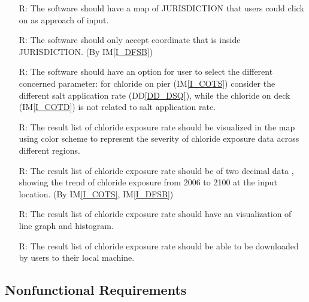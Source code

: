 \documentclass[12pt]{article}
\newcommand{\ddref}[1]{DD\ref{#1}}
\newcommand{\iref}[1]{IM\ref{#1}}
\newcounter{reqnum} %
\begin{document}
\begin{itemize}
\item[R\refstepcounter{reqnum}\thereqnum \label{R_InputMap}:] The software should have a map of JURISDICTION that users could click on as approach of input.

\item[R\refstepcounter{reqnum}\thereqnum \label{R_Inputs}:] The software should only accept coordinate that is inside JURISDICTION. (By \iref{I_DFSB})

\item[R\refstepcounter{reqnum}\thereqnum \label{R_Parameter}:] The software should have an option for user to select the different concerned parameter: for chloride on pier (\iref{I_COTS}) consider the different salt application rate (\ddref{DD_DSQ}), while the chloride on deck (\iref{I_COTD}) is not related to salt application rate.

\item[R\refstepcounter{reqnum}\thereqnum \label{R_Map}:] The result list of chloride exposure rate should be visualized in the map using color scheme to represent the severity of chloride exposure data across different regions.

\item[R\refstepcounter{reqnum}\thereqnum \label{R_OutputInputs}:] The result list of chloride exposure rate should be of two decimal data , showing the trend of chloride exposure from 2006 to 2100 at the input location. (By \iref{I_COTS}, \iref{I_DFSB})

\item[R\refstepcounter{reqnum}\thereqnum \label{R_OutputVisualization}:] The result list of chloride exposure rate should have an visualization of line graph and histogram. 

\item[R\refstepcounter{reqnum}\thereqnum \label{R_OutputDownload}:] The result list of chloride exposure rate 
should be able to be downloaded by users to their local machine. 


\end{itemize}


\subsection{Nonfunctional Requirements}
\end{document}

